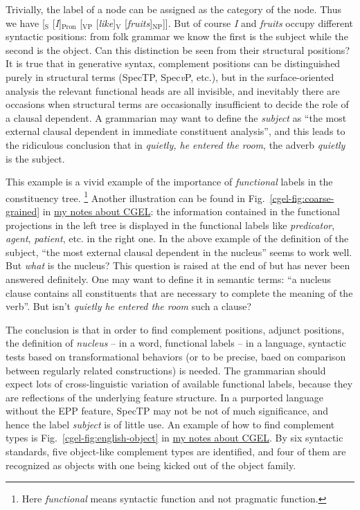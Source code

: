 \documentclass{article}
\newcommand*{\citefig}[1]{Fig.~{#1}}
\newcommand*{\term}[1]{\emph{#1}}
\newcommand*{\corpus}[1]{\emph{#1}}
\newcommand*{\vP}{\textit{v}P}
\newcommand{\cgel}{\href{../English/cambridge.pdf}{my notes about CGEL}}
\begin{document}
Trivially, the label of a node can be assigned as the category of the node.
Thus we have 
{[$_{\text{S}}$ [\corpus{I}]$_{\text{Pron}}$ [$_{\text{VP}}$ [\corpus{like}]$_{\text{V}}$ [\corpus{fruits}]$_{\text{NP}}$]]}.
But of course \corpus{I} and \corpus{fruits} occupy different syntactic positions:
from folk grammar we know the first is the subject while the second is the object.
Can this distinction be seen from their structural positions?
It is true that in generative syntax,
complement positions can be distinguished purely in structural terms 
(SpecTP, Spec\vP, etc.),
but in the surface-oriented analysis the relevant functional heads are all invisible,
and inevitably there are occasions 
when structural terms are occasionally insufficient to decide the role of a clausal dependent.
A grammarian may want to define the \term{subject} as 
``the most external clausal dependent in immediate constituent analysis'',
and this leads to the ridiculous conclusion that 
in \corpus{quietly, he entered the room}, 
the adverb \corpus{quietly} is the subject.

This example is a vivid example of the importance of \emph{functional} labels in the constituency tree.%
\footnote{
    Here \term{functional} means syntactic function and not pragmatic function.
}
Another illustration can be found in \citefig{\ref{cgel-fig:coarse-grained}} in \cgel:
the information contained in the functional projections in the left tree 
is displayed in the functional labels like \term{predicator}, \term{agent}, \term{patient}, etc.
in the right one.
In the above example of the definition of the subject,
``the most external clausal dependent in the nucleus'' seems to work well.
But \emph{what} is the nucleus?
This question is raised at the end of  
but has never been answered definitely.
One may want to define it in semantic terms:
``a nucleus clause contains all constituents that are necessary to complete the meaning of the verb''.
But isn't \corpus{quietly he entered the room} such a clause?

The conclusion is that in order to find 
complement positions, adjunct positions, the definition of \term{nucleus} 
-- in a word, functional labels -- in a language, 
syntactic tests based on transformational behaviors 
(or to be precise, baed on comparison between regularly related constructions) is needed.
The grammarian should expect lots of cross-linguistic variation of available functional labels,
because they are reflections of the underlying feature structure.
In a purported language without the EPP feature, SpecTP may not be not of much significance,
and hence the label \term{subject} is of little use.
An example of how to find complement types is \citefig{\ref{cgel-fig:english-object}} in \cgel.
By six syntactic standards, five object-like complement types are identified,
and four of them are recognized as objects with one being kicked out of the object family.
\end{document}
